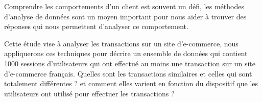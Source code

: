 Comprendre les comportements d'un client est souvent un défi, les méthodes d'analyse de données sont un moyen important pour nous aider à trouver des réponses qui nous permettent d'analyser ce comportement.

Cette étude vise à analyser les transactions sur un site d'e-commerce, nous appliquerons ces techniques pour décrire un ensemble de données qui contient 1000 sessions d'utilisateurs qui ont effectué au moins une transaction sur un site d'e-commerce français. Quelles sont les transactions similaires et celles qui sont totalement différentes ? et comment elles varient en fonction du dispositif que les utilisateurs ont utilisé pour effectuer les transactions ?
